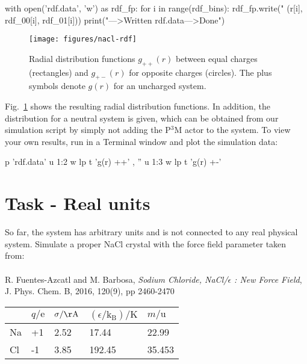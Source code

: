 \documentclass[
a4paper,                        %
11pt,                           %
twoside,                        %
footsepline,                    %
headsepline,                    %
headexclude,                    %
footexclude,                    %
pagesize,                       %
]{scrartcl}
\begin{document}
\begin{pypresso}
with open('rdf.data', 'w') as rdf_fp:
    for i in range(rdf_bins):
        rdf_fp.write("%
                (r[i], rdf_00[i], rdf_01[i]))
print("\n--->Written rdf.data\n--->Done")
\end{pypresso}

\begin{figure}[tb]
  \centering
  \texttt{[image: figures/nacl-rdf]}
  \caption{Radial distribution functions $g_{++}(r)$ between equal
    charges (rectangles) and $g_{+-}(r)$ for opposite charges
    (circles). The plus symbols denote $g(r)$ for an uncharged
    system.}
  \label{fig:rdf}
\end{figure}

Fig.~\ref{fig:rdf} shows the resulting radial distribution functions. In
addition, the distribution for a neutral system is given, which can be obtained
from our simulation script by simply not adding the P$^3$M actor to the system.
To view your own results, run  in a Terminal window
and plot the simulation data:

\begin{pypresso}
p 'rdf.data' u 1:2 w lp t 'g(r) ++' , '' u 1:3 w lp t 'g(r) +-'
\end{pypresso}

\section{Task - Real units}

So far, the system has arbitrary units and is not connected to any real physical system.
Simulate a proper NaCl crystal with the force field parameter taken from:\\
\\
\noindent R. Fuentes-Azcatl and M. Barbosa, \emph{Sodium Chloride, NaCl/$\epsilon$ : New Force Field},\\ J. Phys. Chem. B, 2016, 120(9), pp 2460-2470
\begin{table}[h]
    \centering
    \begin{tabular}{l|llll}
           & $q/\mathrm{e}$  & $\sigma / \mathrm{\AA} $ & $(\epsilon /\mathrm{k_B})/\mathrm{K}$ & $m/\mathrm{u}$  \\
        \hline
        Na & +1     & 2.52          & 17.44                 & 22.99  \\
        \hline
        Cl & -1     & 3.85          & 192.45                & 35.453 
    \end{tabular}
\end{table}
\end{document}
